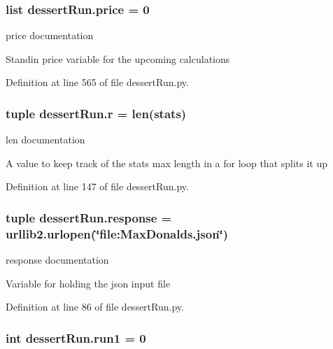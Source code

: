 \hypertarget{namespacedessertRun_a0c46f81b249bbd1c1db625da5f604474}{
\subsubsection[{price}]{\setlength{\rightskip}{0pt plus 5cm}list dessert\-Run.\-price = 0}}\label{namespacedessertRun_a0c46f81b249bbd1c1db625da5f604474}


price documentation 

Standin price variable for the upcoming calculations 

Definition at line 565 of file dessert\-Run.\-py.

\hypertarget{namespacedessertRun_a5f68dbb974d97cc9b458d986a6e9614c}{
\subsubsection[{r}]{\setlength{\rightskip}{0pt plus 5cm}tuple dessert\-Run.\-r = len({\bf stats})}}\label{namespacedessertRun_a5f68dbb974d97cc9b458d986a6e9614c}


len documentation 

A value to keep track of the stats max length in a for loop that splits it up 

Definition at line 147 of file dessert\-Run.\-py.

\hypertarget{namespacedessertRun_af13b95ccc7547d10a658843e2c8a9aa1}{
\subsubsection[{response}]{\setlength{\rightskip}{0pt plus 5cm}tuple dessert\-Run.\-response = urllib2.\-urlopen(\char`\"{}file\-:\-Max\-Donalds.\-json\char`\"{})}}\label{namespacedessertRun_af13b95ccc7547d10a658843e2c8a9aa1}


response documentation 

Variable for holding the json input file 

Definition at line 86 of file dessert\-Run.\-py.

\hypertarget{namespacedessertRun_a347ecfd5a39cfc664f1169f75bb95ad5}{
\subsubsection[{run1}]{\setlength{\rightskip}{0pt plus 5cm}int dessert\-Run.\-run1 = 0}}\label{namespacedessertRun_a347ecfd5a39cfc664f1169f75bb95ad5}



